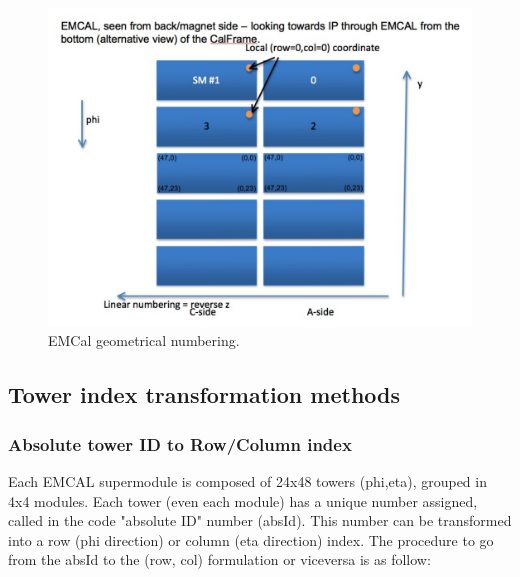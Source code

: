 \begin{figure}[ht]
\begin{center}
\includegraphics[width=1.0\textwidth]{figures/EMCALMap2.pdf}
\end{center}
\caption{\label{fig:Map2}EMCal geometrical numbering.}
\end{figure}


\subsection{Tower index transformation methods}
\subsubsection{Absolute tower ID to Row/Column index}

Each EMCAL supermodule is composed of 24x48 towers (phi,eta), grouped in 4x4 modules. Each tower (even each module) has a unique number assigned, called in the code "absolute ID" number (absId). This number can be transformed into a row (phi direction) or column (eta direction) index. The procedure to go from the absId to the (row, col) formulation or viceversa is as follow:

